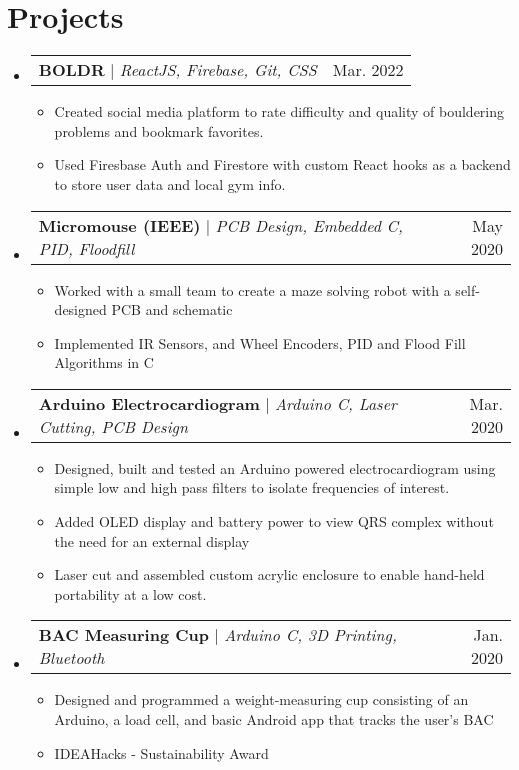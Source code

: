 \documentclass[letterpaper,11pt]{article}
\makeatletter
\newcommand{\resumeItem}[1]{
  \item\small{
    {#1 \vspace{-2pt}}
  }
}
\newcommand{\resumeProjectHeading}[2]{
    \item
    \begin{tabular*}{0.97\textwidth}{l@{\extracolsep{\fill}}r}
      \small#1 & #2 \\
    \end{tabular*}\vspace{-7pt}
}
\newcommand{\resumeSubHeadingListStart}{\begin{itemize}[leftmargin=0.15in, label={}]}
\newcommand{\resumeSubHeadingListEnd}{\end{itemize}}
\newcommand{\resumeItemListStart}{\begin{itemize}}
\newcommand{\resumeItemListEnd}{\end{itemize}\vspace{-5pt}}
\makeatother
\begin{document}
\section{Projects}
    \resumeSubHeadingListStart
      \resumeProjectHeading
      {\textbf{BOLDR} $|$ \emph{ReactJS, Firebase, Git, CSS}}{Mar. 2022}
      \resumeItemListStart
        \resumeItem{
          Created social media platform to rate difficulty and quality of 
          bouldering problems and bookmark favorites. 
        }
        \resumeItem{
          Used Firesbase Auth and Firestore with custom React hooks as a backend 
          to store user data and local gym info.
        }
      \resumeItemListEnd
      \resumeProjectHeading
          {\textbf{Micromouse (IEEE)} $|$ \emph{PCB Design, Embedded C, PID, Floodfill}}{May 2020}
          \resumeItemListStart
            \resumeItem{
              Worked with a small team to create a maze solving robot with a 
              self-designed PCB and schematic
            }
            \resumeItem{
              Implemented IR Sensors, and Wheel Encoders, PID and Flood Fill 
              Algorithms in C
            }
          \resumeItemListEnd
        \resumeProjectHeading
          {\textbf{Arduino Electrocardiogram} $|$ \emph{Arduino C, Laser Cutting, PCB Design}}{Mar. 2020}
          \resumeItemListStart
            \resumeItem{
              Designed, built and tested an Arduino powered electrocardiogram 
              using simple low and high pass filters to isolate frequencies of 
              interest.
            }
            \resumeItem{
              Added OLED display and battery power to view QRS complex without 
              the need for an external display
            }
            \resumeItem{
              Laser cut and assembled custom acrylic enclosure to enable hand-held 
              portability at a low cost.
            }
          \resumeItemListEnd
      \resumeProjectHeading
          {\textbf{BAC Measuring Cup} $|$ \emph{Arduino C, 3D Printing, Bluetooth}}{Jan. 2020}
          \resumeItemListStart
            \resumeItem{
              Designed and programmed a weight-measuring cup consisting of an 
              Arduino, a load cell, and basic Android app that tracks the user's 
              BAC
            }
            \resumeItem{
              IDEAHacks - Sustainability Award
            }
          \resumeItemListEnd
    \resumeSubHeadingListEnd

\end{document}

